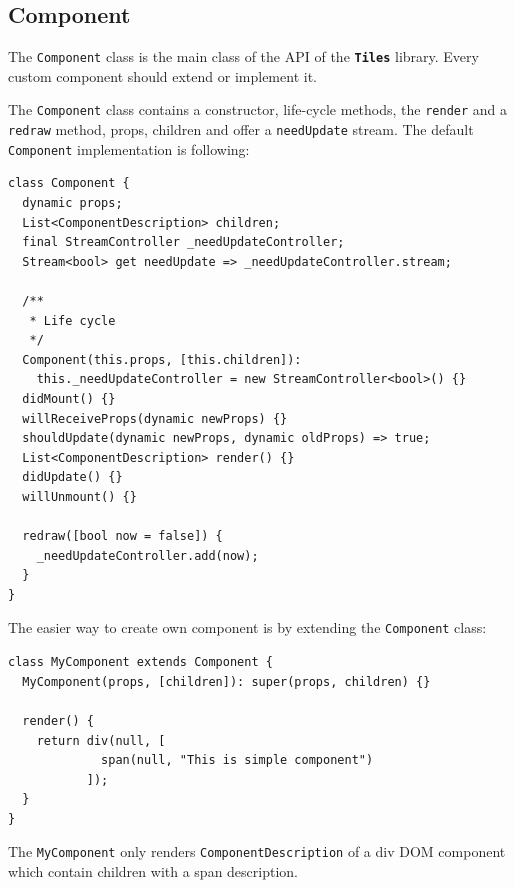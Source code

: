 \documentclass[oneside, 12pt]{book}
\newcommand{\tiles}[0]{\textbf{\texttt{Tiles}} }
\begin{document}


  \subsection{Component}\label{subsec:our-api-component}

    The \texttt{Component} class is the main class of the API of the \tiles library.
    Every custom component should extend or implement it. 

    The \texttt{Component} class contains a constructor, life-cycle methods, 
    the \texttt{render} and a \texttt{redraw} method, props, children and offer a \texttt{needUpdate} stream.
    The default \texttt{Component} implementation is following: 
\begin{verbatim}
class Component {
  dynamic props;
  List<ComponentDescription> children;
  final StreamController _needUpdateController;
  Stream<bool> get needUpdate => _needUpdateController.stream; 

  /**
   * Life cycle
   */
  Component(this.props, [this.children]): 
    this._needUpdateController = new StreamController<bool>() {}
  didMount() {}
  willReceiveProps(dynamic newProps) {}
  shouldUpdate(dynamic newProps, dynamic oldProps) => true;
  List<ComponentDescription> render() {}
  didUpdate() {}
  willUnmount() {}
  
  redraw([bool now = false]) {
    _needUpdateController.add(now);
  }
}
\end{verbatim}



    The easier way to create own component is by extending the \texttt{Component} class:
\begin{verbatim}
class MyComponent extends Component {
  MyComponent(props, [children]): super(props, children) {}

  render() {
    return div(null, [
             span(null, "This is simple component")
           ]);
  }
}
\end{verbatim}



    The \texttt{MyComponent} only renders \texttt{ComponentDescription} of a div DOM component which contain children with a span description.
\end{document}
